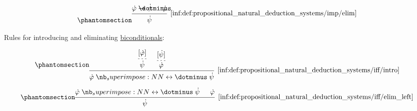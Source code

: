 \begin{definition}
\begin{thmenum}
\begin{paracol}{2}
      \begin{rightcolumn}
        \ParacolAlignmentHack
        \begin{equation*}\taglabel[\ensuremath{ \rightarrow_- }]{inf:def:propositional_natural_deduction_systems/imp/elim}
          \begin{prooftree}[center=false]
            \hypo{ \syn\varphi \synimplies \syn\psi }
            \hypo{ \syn\varphi }
            \infer2[\ref{inf:def:propositional_natural_deduction_systems/imp/elim}]{ \syn\psi }
          \end{prooftree}
        \end{equation*}
      \end{rightcolumn}
    \end{paracol}

    \mimprovised Rules for introducing and eliminating \hyperref[def:propositional_alphabet/connectives/biconditional]{biconditionals}:
    \begin{paracol}{3}
      \begin{leftcolumn}
        \ParacolAlignmentHack
        \begin{equation*}\taglabel[\ensuremath{ \leftrightarrow_+ }]{inf:def:propositional_natural_deduction_systems/iff/intro}
          \begin{prooftree}
            \hypo{ [\syn\varphi] }
            \infer[dashed]1{ \syn\psi }
            \hypo{ [\syn\psi] }
            \infer[dashed]1{ \syn\varphi }
            \infer2[\ref{inf:def:propositional_natural_deduction_systems/iff/intro}]{ \syn\varphi \syniff \syn\psi }
          \end{prooftree}
        \end{equation*}
      \end{leftcolumn}

      \begin{nthcolumn}{1}
        \ParacolAlignmentHack
        \begin{equation*}\taglabel[\ensuremath{ \leftrightarrow_{-L} }]{inf:def:propositional_natural_deduction_systems/iff/elim_left}
          \begin{prooftree}
            \hypo{ \syn\varphi \syniff \syn\psi }
            \hypo{ \syn\varphi }
            \infer2[\ref{inf:def:propositional_natural_deduction_systems/iff/elim_left}]{ \syn\psi }
          \end{prooftree}
        \end{equation*}
      \end{nthcolumn}


\end{paracol}
\end{thmenum}
\end{definition}
